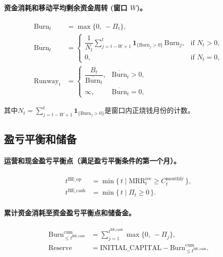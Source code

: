 \documentclass[11点, A4纸, 单面]{article}
\begin{document}
\paragraph{资金消耗和移动平均剩余资金周转 (窗口 $W$)。}
\begin{align}
\mathrm{Burn}_t &= \max\{0,\ -\Pi_t\},\\
\overline{\mathrm{Burn}}_t 
  &= 
  \begin{cases}
    \dfrac{1}{N_t} \sum_{j=t-W+1}^{t} \mathbf{1}_{\{\mathrm{Burn}_j>0\}}\, \mathrm{Burn}_j, & \text{if } N_t>0,\\[6pt]
    0, & \text{if } N_t=0,
  \end{cases}\\
\mathrm{Runway}_t 
  &= 
  \begin{cases}
    \dfrac{B_t}{\overline{\mathrm{Burn}}_t}, & \overline{\mathrm{Burn}}_t > 0,\\[6pt]
    \infty, & \overline{\mathrm{Burn}}_t = 0,
  \end{cases}
\end{align}



其中$N_t=\sum_{j=t-W+1}^{t}\mathbf{1}_{\{\mathrm{Burn}_j>0\}}$是窗口内正烧钱月份的计数。

\subsection{盈亏平衡和储备}
\paragraph{运营和现金盈亏平衡点（满足盈亏平衡条件的第一个月）。}
\begin{align}
t^{\mathrm{BE\_op}} 
  &= \min\{\, t \mid \mathrm{MRR}^{\mathrm{rec}}_t \ge C^{\mathrm{monthly}}_t \,\},\\
t^{\mathrm{BE\_cash}} 
  &= \min\{\, t \mid \Pi_t \ge 0 \,\}.
\end{align}

\paragraph{累计资金消耗至资金盈亏平衡点和储备金。}
\begin{align}
\mathrm{Burn}^{\mathrm{cum}}_{\le t^{\mathrm{BE\_cash}}} 
  &= \sum_{j=1}^{t^{\mathrm{BE\_cash}}} \max\{0,\ -\Pi_j\},\\
\mathrm{Reserve}
  &= \text{INITIAL\_CAPITAL} - \mathrm{Burn}^{\mathrm{cum}}_{\le t^{\mathrm{BE\_cash}}}.
\end{align}
\end{document}
